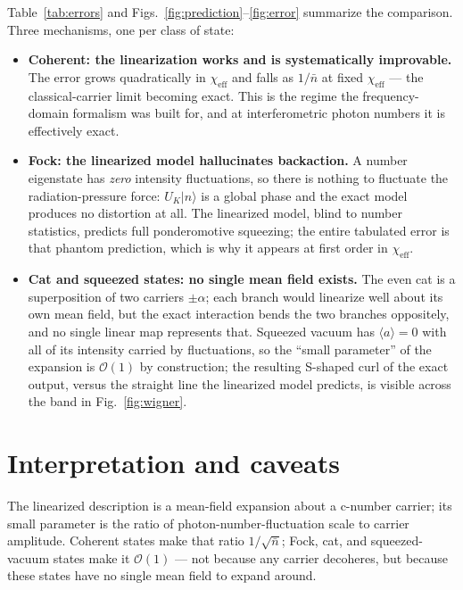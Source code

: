 \documentclass[11pt]{article}
\newcommand{\nbar}{\bar{n}}
\newcommand{\chieff}{\chi_{\mathrm{eff}}}
\begin{document}
Table~\ref{tab:errors} and Figs.~\ref{fig:prediction}--\ref{fig:error}
summarize the comparison. Three mechanisms, one per class of state:

\begin{itemize}
\item \textbf{Coherent: the linearization works and is systematically
improvable.} The error grows quadratically in $\chieff$ and falls as
$1/\nbar$ at fixed $\chieff$ --- the classical-carrier limit becoming
exact. This is the regime the frequency-domain formalism was built for,
and at interferometric photon numbers it is effectively exact.

\item \textbf{Fock: the linearized model hallucinates backaction.} A
number eigenstate has \emph{zero} intensity fluctuations, so there is
nothing to fluctuate the radiation-pressure force:
$U_K|n\rangle$ is a global phase and the exact model produces no
distortion at all. The linearized model, blind to number statistics,
predicts full ponderomotive squeezing; the entire tabulated error is that
phantom prediction, which is why it appears at first order in $\chieff$.

\item \textbf{Cat and squeezed states: no single mean field exists.} The
even cat is a superposition of two carriers $\pm\alpha$; each branch would
linearize well about its own mean field, but the exact interaction bends
the two branches oppositely, and no single linear map represents that.
Squeezed vacuum has $\langle a \rangle = 0$ with
all of its intensity carried by fluctuations, so the ``small parameter''
of the expansion is $\mathcal{O}(1)$ by construction; the resulting
S-shaped curl of the exact output, versus the straight line the linearized
model predicts, is visible across the band in Fig.~\ref{fig:wigner}.
\end{itemize}

\section{Interpretation and caveats}

The linearized description is a mean-field expansion about a c-number
carrier; its small parameter is the ratio of photon-number-fluctuation
scale to carrier amplitude. Coherent states make that ratio $1/\sqrt{\nbar}$;
Fock, cat, and squeezed-vacuum states make it $\mathcal{O}(1)$ --- not
because any carrier decoheres, but because these states have no single
mean field to expand around.
\end{document}
